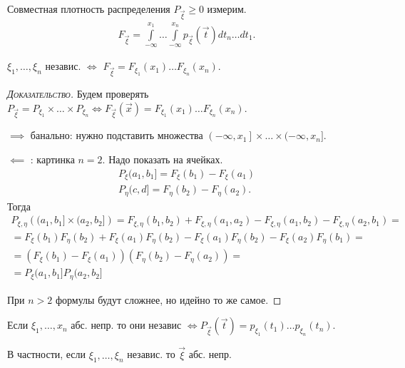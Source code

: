 \begin{df}
 Совместная плотность распределения $ P_{\vec\xi} \geqslant 0 $  измерим.
 \begin{align*}
  F_{\vec\xi} = \int\limits_{-\infty}^{x_1}  \ldots \int\limits_{-\infty}^{x_n} p_{\vec\xi}(\vec t) dt_n \ldots dt_1.
 \end{align*} 
\end{df}
\begin{crly}
 $ \xi_1, \ldots, \xi_n $ независ. $ \iff $ $ F_{\vec\xi} = F_{\xi_1}(x_1) \ldots F_{\xi_n}(x_n) $.
\end{crly}
\begin{proof}[\normalfont\textsc{Доказательство}]
 Будем проверять $ P_{\vec\xi} = P_{\xi_1} \times \ldots \times P_{\xi_n} \iff F_{\vec\xi}(\vec x) = F_{\xi_1}(x_1) \ldots F_{\xi_n}(x_n) $.

 $ \implies $  банально: нужно подставить множества $ \left(-\infty, x_1\right] \times \ldots \times (-\infty, x_n]   $.

 $ \impliedby $ : картинка $ n=2 $. Надо показать на ячейках. 
 \begin{align*}
  P_{\xi} (a_1,b_1] = F_{\xi}(b_1) - F_{\xi}(a_1) \\
  P_{\eta} (c,d] = F_{\eta}(b_2) - F_{\eta}(a_2).
 \end{align*} Тогда
 \begin{align*}
	 P_{\xi, \eta} \left( (a_1, b_1] \times (a_2, b_2] \right) 
	 = F_{\xi, \eta} (b_1, b_2) + F_{\xi, \eta} (a_1, a_2) - F_{\xi, \eta} (a_1, b_2) - F_{\xi, \eta}(a_2, b_1) = \\ 
	 = F_{\xi} (b_1) F_{\eta} (b_2) + F_{\xi}(a_1) F_{\eta} (b_2) - F_{\xi}(a_1) F_{\eta} (b_2) - F_{\xi} (a_2) F_{\eta} (b_1) = \\
	 = \left(F_{\xi} (b_1) - F_{\xi} (a_1) \right) \left( F_{\eta} (b_2) - F_{\eta} (a_2) \right) = \\
	 = P_\xi (a_1, b_1] P_\eta (a_2, b_2]
 \end{align*}

 При $n > 2$ формулы будут сложнее, но идейно то же самое.

\end{proof}
\begin{crly}
 Если $ \xi_1, \ldots, x_n $ абс. непр. то они независ $ \iff P_{\vec\xi}(\vec t) = p_{\xi_1}(t_1) \ldots p_{\xi_n}(t_n) $.

 В частности, если $ \xi_1, \ldots, \xi_n $ независ. то $ \vec\xi $ абс. непр.
\end{crly}
